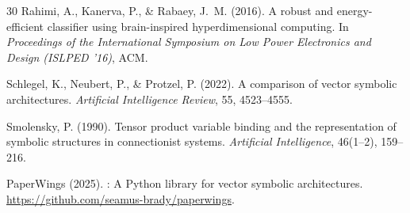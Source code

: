\documentclass[11pt]{article}
\begin{document}
\begin{thebibliography}{30}
Rahimi, A., Kanerva, P., \& Rabaey, J.~M. (2016).
\newblock A robust and energy-efficient classifier using brain-inspired hyperdimensional computing.
\newblock In \textit{Proceedings of the International Symposium on Low Power Electronics and Design (ISLPED '16)}, ACM.

Schlegel, K., Neubert, P., \& Protzel, P. (2022).
\newblock A comparison of vector symbolic architectures.
\newblock \textit{Artificial Intelligence Review}, 55, 4523--4555.

Smolensky, P. (1990).
\newblock Tensor product variable binding and the representation of symbolic structures in connectionist systems.
\newblock \textit{Artificial Intelligence}, 46(1--2), 159--216.

{PaperWings} (2025).
: A Python library for vector symbolic architectures.
\newblock \url{https://github.com/seamus-brady/paperwings}.

\end{thebibliography}
\end{document}

